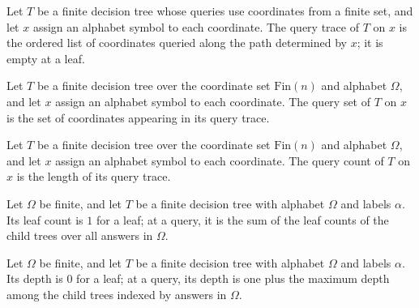\begin{definition}
\label{FABL.FiniteDecisionTree.queryTrace}
\leanok
{}
Let $T$ be a finite decision tree whose queries use coordinates from a finite set, and
let $x$ assign an alphabet symbol to each coordinate. The query trace of $T$ on $x$ is
the ordered list of coordinates queried along the path determined by $x$; it is empty at
a leaf.
\end{definition}

\begin{definition}
\label{FABL.FiniteDecisionTree.querySet}
\leanok
{}
Let $T$ be a finite decision tree over the coordinate set $\mathrm{Fin}(n)$ and alphabet
$Ω$, and let $x$ assign an alphabet symbol to each coordinate. The query set of $T$ on
$x$ is the set of coordinates appearing in its query trace.
\end{definition}

\begin{definition}
\label{FABL.FiniteDecisionTree.queryCount}
\leanok
{}
Let $T$ be a finite decision tree over the coordinate set $\mathrm{Fin}(n)$ and alphabet
$Ω$, and let $x$ assign an alphabet symbol to each coordinate. The query count of $T$ on
$x$ is the length of its query trace.
\end{definition}

\begin{definition}
\label{FABL.FiniteDecisionTree.leafCount}
\leanok
{}
Let $\Omega$ be finite, and let $T$ be a finite decision tree with alphabet $\Omega$ and
labels $\alpha$. Its leaf count is $1$ for a leaf; at a query, it is the sum of the leaf
counts of the child trees over all answers in $\Omega$.
\end{definition}

\begin{definition}
\label{FABL.FiniteDecisionTree.depth}
\leanok
{}
Let $\Omega$ be finite, and let $T$ be a finite decision tree with alphabet $\Omega$ and
labels $\alpha$. Its depth is $0$ for a leaf; at a query, its depth is one plus the
maximum depth among the child trees indexed by answers in $\Omega$.
\end{definition}

